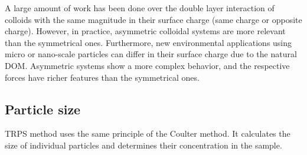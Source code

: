 \documentclass[journal=langd5,manuscript=article]{achemso}
\begin{document}


A large amount of work has been done over the double layer interaction of colloids with the same magnitude in their surface charge (same charge or opposite charge). However, in practice, asymmetric colloidal systems are more relevant than the symmetrical ones.
Furthermore, new environmental  applications using micro or nano-scale particles can differ in their surface charge due to the natural DOM.
Asymmetric systems show a more complex behavior, and the respective forces have richer features than the symmetrical ones\cite{Ruiz-Cabello2013}.


\subsection{Particle size}
TRPS method uses the same principle of the Coulter method. It calculates the size of individual particles 
and determines their  concentration in the sample.


\end{document}
